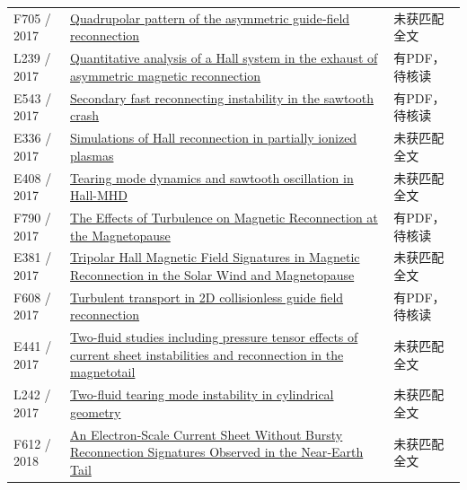\documentclass[UTF8,a4paper,11pt,openany,fontset=fandol]{ctexbook}
\begin{document}
\begin{longtable}{P{24mm}P{97mm}P{27mm}}
F705 / 2017 & \href{https://doi.org/10.1002/2016ja023666}{Quadrupolar pattern of the asymmetric guide‐field reconnection} & 未获匹配全文\\

L239 / 2017 & \href{https://doi.org/10.1002/2016ja023620}{Quantitative analysis of a Hall system in the exhaust of asymmetric magnetic reconnection} & 有PDF，待核读\\

E543 / 2017 & \href{https://doi.org/10.1063/1.4973328}{Secondary fast reconnecting instability in the sawtooth crash} & 有PDF，待核读\\

E336 / 2017 & \href{http://ui.adsabs.harvard.edu/abs/2017EGUGA..1915103I/abstract}{Simulations of Hall reconnection in partially ionized plasmas} & 未获匹配全文\\

E408 / 2017 & \href{http://absimage.aps.org/image/DPP17/MWS_DPP17-2017-000073.pdf}{Tearing mode dynamics and sawtooth oscillation in Hall-MHD} & 未获匹配全文\\

F790 / 2017 & \href{https://doi.org/10.13016/m24q7qq78}{The Effects of Turbulence on Magnetic Reconnection at the Magnetopause} & 有PDF，待核读\\

E381 / 2017 & \href{https://ui.adsabs.harvard.edu/abs/2017shin.confE..42C/abstract}{Tripolar Hall Magnetic Field Signatures in Magnetic Reconnection in the Solar Wind and Magnetopause} & 未获匹配全文\\

F608 / 2017 & \href{https://doi.org/10.1063/1.4975086}{Turbulent transport in 2D collisionless guide field reconnection} & 有PDF，待核读\\

E441 / 2017 & \href{https://ui.adsabs.harvard.edu/abs/2017AGUFMSM11C2328N/abstract}{Two-fluid studies including pressure tensor effects of current sheet instabilities and reconnection in the magnetotail} & 未获匹配全文\\

L242 / 2017 & \href{https://doi.org/10.1063/1.4986116}{Two-fluid tearing mode instability in cylindrical geometry} & 未获匹配全文\\

F612 / 2018 & \href{https://doi.org/10.1002/2017gl076330}{An Electron‐Scale Current Sheet Without Bursty Reconnection Signatures Observed in the Near‐Earth Tail} & 未获匹配全文\\


\end{longtable}
\end{document}
